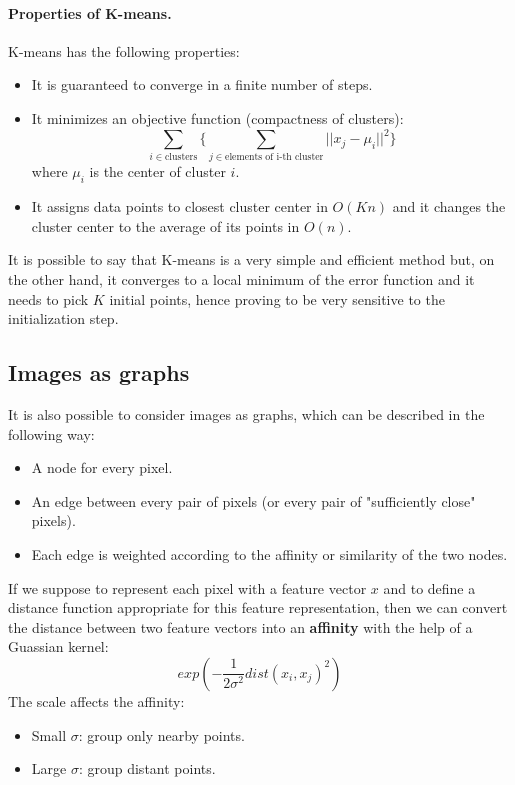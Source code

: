 \paragraph*{Properties of K-means.} K-means has the following properties:
\begin{itemize}
	\item It is guaranteed to converge in a finite number of steps.
	\item It minimizes an objective function (compactness of clusters):
	$$\sum_{i \in \text{clusters}} \Biggl\{ \sum_{j \in \text{elements of i-th cluster}} ||x_j - \mu_i||^2 \Biggr\}$$
	where $\mu_i$ is the center of cluster $i$.
	\item It assigns data points to closest cluster center in $O(Kn)$ and it changes the cluster center to the average of its points in $O(n)$.
\end{itemize}
It is possible to say that K-means is a very simple and efficient method but, on the other hand, it converges to a local minimum of the error function and it needs to pick $K$ initial points, hence proving to be very sensitive to the initialization step.

\subsection{Images as graphs}
It is also possible to consider images as graphs, which can be described in the following way:
\begin{itemize}
	\item A node for every pixel.
	\item An edge between every pair of pixels (or every pair of "sufficiently close" pixels).
	\item Each edge is weighted according to the affinity or similarity of the two nodes.
\end{itemize}  
If we suppose to represent each pixel with a feature vector $x$ and to define a distance function appropriate for this feature representation, then we can convert the distance between two feature vectors into an \textbf{affinity} with the help of a Guassian kernel:
$$exp\left(-\frac{1}{2\sigma^2} dist(x_i, x_j)^2\right)$$
The scale affects the affinity:
\begin{itemize}
	\item Small $\sigma$: group only nearby points.
	\item Large $\sigma$: group distant points.
\end{itemize}

